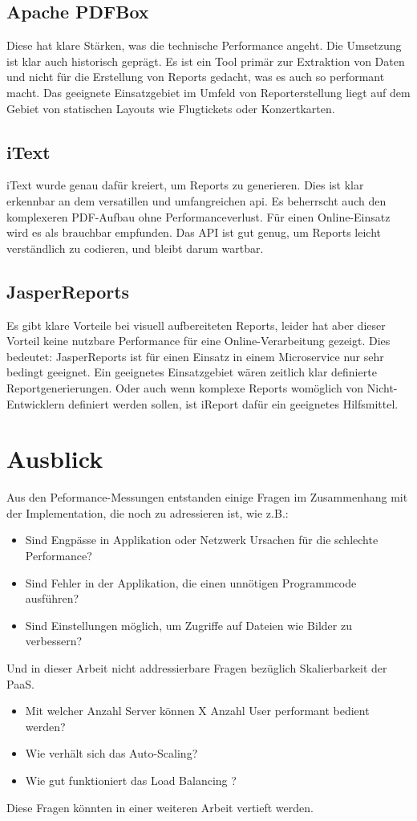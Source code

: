 \documentclass[main.tex]{subfiles}
\begin{document}
\subsection{Apache PDFBox}
Diese hat klare Stärken, was die technische Performance angeht. Die Umsetzung ist klar auch historisch geprägt. Es ist ein Tool primär zur Extraktion von Daten und nicht für die Erstellung von Reports gedacht, was es auch so performant macht. Das geeignete Einsatzgebiet im Umfeld von Reporterstellung liegt auf dem Gebiet von statischen Layouts wie Flugtickets oder Konzertkarten.


\subsection{iText}

iText wurde genau dafür kreiert, um Reports zu generieren. Dies ist klar erkennbar an dem versatillen und umfangreichen \acrshort{api}. Es beherrscht auch den komplexeren PDF-Aufbau ohne Performanceverlust. Für einen Online-Einsatz wird es als brauchbar empfunden. Das API ist gut genug, um Reports leicht verständlich zu codieren, und bleibt darum wartbar.

\subsection{JasperReports}
Es gibt klare Vorteile bei visuell aufbereiteten Reports, leider hat aber dieser Vorteil keine nutzbare Performance für eine Online-Verarbeitung gezeigt. Dies bedeutet: JasperReports ist für einen Einsatz in einem Microservice nur sehr bedingt geeignet. Ein geeignetes Einsatzgebiet wären zeitlich klar definierte Reportgenerierungen. Oder auch wenn komplexe Reports womöglich von Nicht-Entwicklern definiert werden sollen, ist iReport dafür ein geeignetes Hilfsmittel.

\section{Ausblick}

Aus den Peformance-Messungen entstanden einige Fragen im Zusammenhang mit der Implementation, die noch zu adressieren ist, wie z.B.: 
\begin{itemize}  
    \item Sind Engpässe in Applikation oder Netzwerk Ursachen für die schlechte Performance? 
    \item Sind Fehler in der Applikation, die einen unnötigen Programmcode ausführen?
    \item Sind Einstellungen möglich, um Zugriffe auf Dateien wie Bilder zu verbessern?
\end{itemize}
Und in dieser Arbeit nicht addressierbare Fragen bezüglich Skalierbarkeit der PaaS.
\begin{itemize}  
    \item Mit welcher Anzahl Server können X Anzahl User performant bedient werden?
    \item Wie verhält sich das Auto-Scaling?
    \item Wie gut funktioniert das Load Balancing ? 
\end{itemize}
Diese Fragen könnten in einer weiteren Arbeit vertieft werden. 
\end{document}
